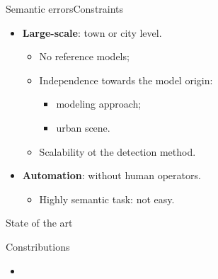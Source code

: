 \documentclass[10pt]{beamer}
\begin{document}
            \begin{frame}{Semantic errors}{Constraints}
                \begin{itemize}[label=$\blacktriangleright$, font=\color{IGNGreen}]
                    \item<1-> \textbf{Large-scale}: town or city level.
                        \begin{itemize}
                            \item<2-6> No reference models;
                            \item<3-6> Independence towards the model origin:
                            \begin{itemize}
                                \item<4-6> modeling approach;
                                \item<5-6> urban scene.
                            \end{itemize}
                            \item<6> Scalability ot the detection method.
                        \end{itemize}
                    \item<7-8> \textbf{Automation}: without human operators.
                        \begin{itemize}
                            \item<8> Highly semantic task: not easy.
                        \end{itemize}
                \end{itemize}
            \end{frame}

        \begin{frame}{State of the art}
            \centering
            
        \end{frame}

        \begin{frame}{Constributions}
            \begin{itemize}[label=$\blacktriangleright$, font=\color{IGNGreen}, itemsep=2em]
                \item<1-> 
            \end{itemize}
        \end{frame}
\end{document}
